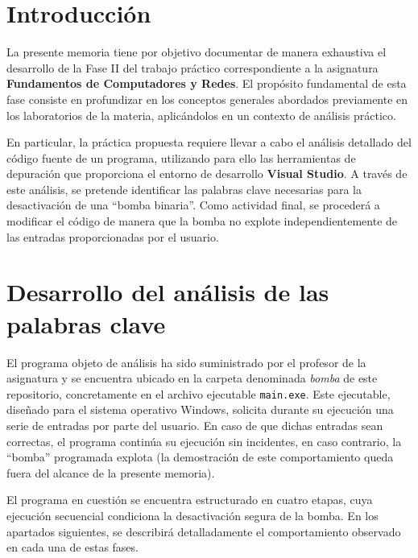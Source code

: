 \documentclass[11pt,a4paper]{article}
\begin{document}
\newpage
\hypersetup{linkcolor=black}
\tableofcontents
\hypersetup{linkcolor=blue}
\newpage

\section{Introducción}
La presente memoria tiene por objetivo documentar de manera exhaustiva el desarrollo de la Fase II del trabajo práctico correspondiente a la asignatura \textbf{Fundamentos de Computadores y Redes}. El propósito fundamental de esta fase consiste en profundizar en los conceptos generales abordados previamente en los laboratorios de la materia, aplicándolos en un contexto de análisis práctico. \vspace{2ex}

\noindent En particular, la práctica propuesta requiere llevar a cabo el análisis detallado del código fuente de un programa, utilizando para ello las herramientas de depuración que proporciona el entorno de desarrollo \textbf{Visual Studio}. A través de este análisis, se pretende identificar las palabras clave necesarias para la desactivación de una ``bomba binaria''. Como actividad final, se procederá a modificar el código de manera que la bomba no explote independientemente de las entradas proporcionadas por el usuario. \vspace{2ex}

\vspace{3ex}

\section{Desarrollo del análisis de las palabras clave}

El programa objeto de análisis ha sido suministrado por el profesor de la asignatura y se encuentra ubicado en la carpeta denominada \textit{bomba} de este repositorio, concretamente en el archivo ejecutable \texttt{main.exe}. Este ejecutable, diseñado para el sistema operativo Windows, solicita durante su ejecución una serie de entradas por parte del usuario. En caso de que dichas entradas sean correctas, el programa continúa su ejecución sin incidentes, en caso contrario, la ``bomba'' programada explota (la demostración de este comportamiento queda fuera del alcance de la presente memoria). \vspace{2ex}

\noindent El programa en cuestión se encuentra estructurado en cuatro etapas, cuya ejecución secuencial condiciona la desactivación segura de la bomba. En los apartados siguientes, se describirá detalladamente el comportamiento observado en cada una de estas fases.\vspace{2ex}
\end{document}
